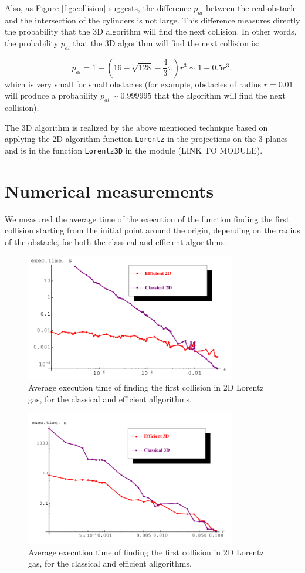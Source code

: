 \documentclass[prl,amsmath,amssymb, twocolumn, showpacs]{revtex4-1}
\newcommand{\pp}{p_{al}}
\begin{document}
Also, as Figure \ref{fig:collision} suggests, the difference $\pp$ between the real obstacle and the intersection of the cylinders is not large. This difference measures directly the probability that the 3D algorithm will find the next collision. In other words, the probability $\pp$ that the 3D algorithm will find the next collision is: 

\begin{equation}
\pp= 1-(16-\sqrt{128}-\frac{4}{3} \pi) r^3 \sim 1-0.5 r^3, 
\end{equation}
which is very small for small obstacles (for example, obstacles of radius $r=0.01$ will produce a probability $\pp \sim 0.999995$ that the algorithm will find the next collision). 

The 3D algorithm is realized by the above mentioned technique based on applying the 2D algorithm function \texttt{Lorentz} in the projections on the 3 planes and is in the function \texttt{Lorentz3D} in the module (LINK TO MODULE).


\section{Numerical measurements}

We measured the average time of the execution of the function finding the first collision starting from the initial point around the origin, depending on the radius of the obstacle, for both the classical and efficient algorithms.

\begin{figure}
\centering
\includegraphics [width=260pt]{fig05.png}
\caption{Average execution time of finding the first collision in 2D Lorentz gas, for the classical and efficient allgorithms.}
\label{fig:fig05}
\end{figure}

\begin{figure}
\centering
\includegraphics [width=260pt]{fig06.png}
\caption{Average execution time of finding the first collision in 2D Lorentz gas, for the classical and efficient allgorithms.}
\label{fig:fig06}
\end{figure}
\end{document}
